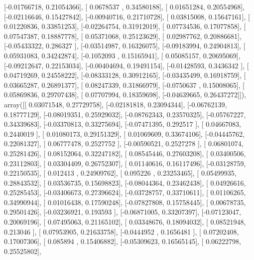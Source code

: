 \documentclass{article}
\begin{document}
       [-0.01766718,  0.21054366],
       [ 0.0678537 ,  0.34580188],
       [ 0.01651284,  0.20554968],
       [-0.02116646,  0.15427842],
       [-0.00940716,  0.21710728],
       [ 0.03815008,  0.15647161],
       [ 0.01220836,  0.33851253],
       [-0.02264754,  0.31912019],
       [ 0.07734536,  0.17077858],
       [ 0.07547387,  0.18887778],
       [ 0.05371068,  0.25123629],
       [ 0.02987762,  0.20886681],
       [-0.05433322,  0.286327  ],
       [-0.03514987,  0.16326075],
       [-0.09183994,  0.24904813],
       [ 0.05931083,  0.34242874],
       [-0.1052093 ,  0.15165941],
       [ 0.05085157,  0.20695069],
       [-0.09212647,  0.22153034],
       [-0.00404694,  0.19491154],
       [-0.01428593,  0.3436342 ],
       [ 0.04719269,  0.24558222],
       [-0.08333128,  0.30912165],
       [-0.03435499,  0.16918759],
       [ 0.03665287,  0.26891377],
       [ 0.08247339,  0.31866979],
       [-0.0750637 ,  0.15008065],
       [ 0.05869836,  0.29707438],
       [ 0.07707994,  0.18359698],
       [-0.04639665,  0.26437272]]), array([[ 0.03071548,  0.27729758],
       [-0.02181818,  0.23094344],
       [-0.06762139,  0.18777129],
       [-0.08019351,  0.25929032],
       [-0.08762343,  0.23570325],
       [-0.05767227,  0.34339683],
       [-0.03370813,  0.33275694],
       [-0.07471395,  0.292517  ],
       [ 0.04667083,  0.2440019 ],
       [ 0.01080173,  0.29151329],
       [ 0.01069609,  0.33674106],
       [-0.04445762,  0.22081327],
       [ 0.06777478,  0.2527752 ],
       [-0.00590521,  0.2527278 ],
       [ 0.06801074,  0.25281426],
       [ 0.08152064,  0.32247182],
       [ 0.08545446,  0.27603208],
       [ 0.03400506,  0.23112803],
       [ 0.03304409,  0.26752307],
       [ 0.01140616,  0.16117496],
       [-0.03128759,  0.22150535],
       [ 0.012413  ,  0.24909762],
       [ 0.095226  ,  0.23253465],
       [ 0.05499935,  0.28843532],
       [ 0.03536735,  0.15698823],
       [-0.08044364,  0.23462438],
       [ 0.04926616,  0.25285453],
       [-0.03406673,  0.27396624],
       [-0.03728757,  0.33710611],
       [ 0.01106265,  0.34990944],
       [ 0.01016438,  0.17590248],
       [-0.07827808,  0.15758445],
       [ 0.00678735,  0.29501426],
       [-0.03236921,  0.193593  ],
       [-0.06871005,  0.33207397],
       [-0.07123047,  0.20069196],
       [ 0.07495063,  0.21165102],
       [ 0.03348676,  0.18094032],
       [ 0.08521948,  0.213046  ],
       [ 0.07953905,  0.21633758],
       [-0.0444952 ,  0.1656481 ],
       [ 0.07202408,  0.17007306],
       [ 0.085894  ,  0.15406882],
       [-0.05309623,  0.16565145],
       [ 0.06222798,  0.25525802],
\end{document}
